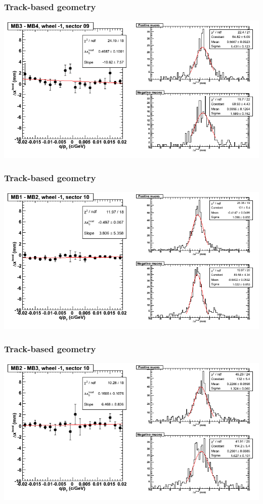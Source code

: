 \documentclass[compress]{beamer}
\begin{document}
\begin{frame}
\frametitle{Track-based geometry}
\includegraphics[width=\linewidth]{NOV4_segdiffs/dt13_resid_B_09_34.png}
\end{frame}

\begin{frame}
\frametitle{Track-based geometry}
\includegraphics[width=\linewidth]{NOV4_segdiffs/dt13_resid_B_10_12.png}
\end{frame}

\begin{frame}
\frametitle{Track-based geometry}
\includegraphics[width=\linewidth]{NOV4_segdiffs/dt13_resid_B_10_23.png}
\end{frame}
\end{document}
